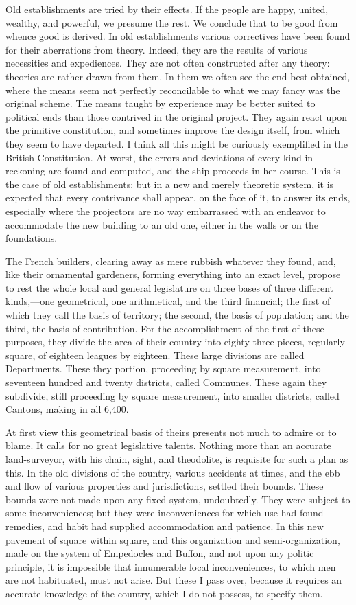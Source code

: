 Old establishments are tried by their effects. If the people are happy, united, wealthy, and powerful, we presume the rest. We conclude that to be good from whence good is derived. In old establishments various correctives have been found for their aberrations from theory. Indeed, they are the results of various necessities and expediences. They are not often constructed after any theory: theories are rather drawn from them. In them we often see the end best obtained, where the means seem not perfectly reconcilable to what we may fancy was the original scheme. The means taught by experience may be better suited to political ends than those contrived in the original project. They again react upon the primitive constitution, and sometimes improve the design itself, from which they seem to have departed. I think all this might be curiously exemplified in the British Constitution. At worst, the errors and deviations of every kind in reckoning are found and computed, and the ship proceeds in her course. This is the case of old establishments; but in a new and merely theoretic system, it is expected that every contrivance shall appear, on the face of it, to answer its ends, especially where the projectors are no way embarrassed with an endeavor to accommodate the new building to an old one, either in the walls or on the foundations.

The French builders, clearing away as mere rubbish whatever they found, and, like their ornamental gardeners, forming everything into an exact level, propose to rest the whole local and general legislature on three bases of three different kinds,—one geometrical, one arithmetical, and the third financial; the first of which they call the basis of territory; the second, the basis of population; and the third, the basis of contribution. For the accomplishment of the first of these purposes, they divide the area of their country into eighty-three pieces, regularly square, of eighteen leagues by eighteen. These large divisions are called Departments. These they portion, proceeding by square measurement, into seventeen hundred and twenty districts, called Communes. These again they subdivide, still proceeding by square measurement, into smaller districts, called Cantons, making in all 6,400.

At first view this geometrical basis of theirs presents not much to admire or to blame. It calls for no great legislative talents. Nothing more than an accurate land-surveyor, with his chain, sight, and theodolite, is requisite for such a plan as this. In the old divisions of the country, various accidents at times, and the ebb and flow of various properties and jurisdictions, settled their bounds. These bounds were not made upon any fixed system, undoubtedly. They were subject to some inconveniences; but they were inconveniences for which use had found remedies, and habit had supplied accommodation and patience. In this new pavement of square within square, and this organization and semi-organization, made on the system of Empedocles and Buffon, and not upon any politic principle, it is impossible that innumerable local inconveniences, to which men are not habituated, must not arise. But these I pass over, because it requires an accurate knowledge of the country, which I do not possess, to specify them.

